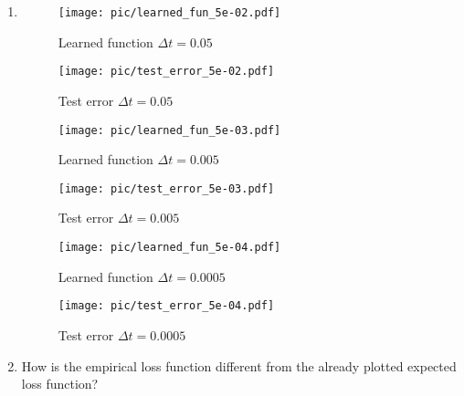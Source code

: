 \documentclass[a4paper,11pt]{scrartcl}
\newcommand*{\Dt}{\Delta{}t}
\begin{document}
\begin{enumerate}
\begin{enumerate}[leftmargin=1em]
  \item
    \begin{figure}[h]
        \begin{minipage}[b]{.5\linewidth}
          \centering
          \texttt{[image: pic/learned\_fun\_5e-02.pdf]}
          \caption{Learned function $\Dt=0.05$}
          \label{fig:learned_fun_0.05}
        \end{minipage}%
        \begin{minipage}[b]{.5\linewidth}
          \centering
          \texttt{[image: pic/test\_error\_5e-02.pdf]}
          \caption{Test error $\Dt=0.05$}
          \label{fig:test_error_0.05}
        \end{minipage}
    \end{figure}
    \begin{figure}[h]
        \begin{minipage}[b]{.5\linewidth}
          \centering
          \texttt{[image: pic/learned\_fun\_5e-03.pdf]}
          \caption{Learned function $\Dt=0.005$}
          \label{fig:learned_fun_0.005}
        \end{minipage}%
        \begin{minipage}[b]{.5\linewidth}
          \centering
          \texttt{[image: pic/test\_error\_5e-03.pdf]}
          \caption{Test error $\Dt=0.005$}
          \label{fig:test_error_0.005}
        \end{minipage}
    \end{figure}
    \begin{figure}[h]
        \begin{minipage}[b]{.5\linewidth}
          \centering
          \texttt{[image: pic/learned\_fun\_5e-04.pdf]}
          \caption{Learned function $\Dt=0.0005$}
          \label{fig:learned_fun_0.0005}
        \end{minipage}%
        \begin{minipage}[b]{.5\linewidth}
          \centering
          \texttt{[image: pic/test\_error\_5e-04.pdf]}
          \caption{Test error $\Dt=0.0005$}
          \label{fig:test_error_0.0005}
        \end{minipage}
    \end{figure}

  \item
    How is the empirical loss function different from the already plotted
    expected loss function?

\end{enumerate}

\end{enumerate}
\end{document}
